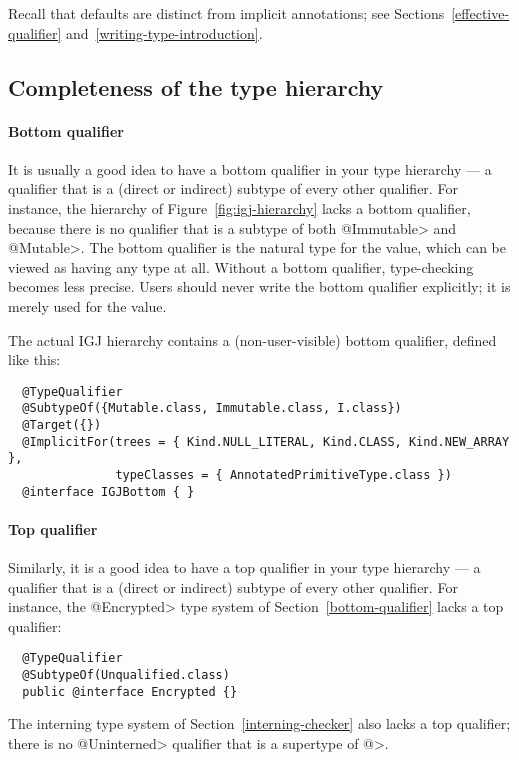 Recall that defaults are distinct
from implicit annotations; see Sections~\ref{effective-qualifier}
and~\ref{writing-type-introduction}.


\subsection{Completeness of the type hierarchy\label{bottom-qualifier}}

\paragraph{Bottom qualifier}
It is usually a good idea to have a bottom qualifier in your type hierarchy
--- a qualifier that is a (direct or indirect) subtype of every other
qualifier.  For instance, the hierarchy of Figure~\ref{fig:igj-hierarchy} lacks
a bottom qualifier, because there is no qualifier that is a subtype of both
\<@Immutable> and \<@Mutable>.
The bottom qualifier is the natural type for the 
value, which can be viewed as having any type at all.  Without a bottom
qualifier, type-checking becomes less precise.
Users should never write the bottom qualifier explicitly; it is merely used
for the  value.

The actual IGJ hierarchy contains a (non-user-visible) bottom qualifier,
defined like this:

\begin{Verbatim}
  @TypeQualifier
  @SubtypeOf({Mutable.class, Immutable.class, I.class})
  @Target({})
  @ImplicitFor(trees = { Kind.NULL_LITERAL, Kind.CLASS, Kind.NEW_ARRAY },
               typeClasses = { AnnotatedPrimitiveType.class })
  @interface IGJBottom { }
\end{Verbatim}



\paragraph{Top qualifier}
Similarly, it is a good idea to have a top qualifier in your type hierarchy
--- a qualifier that is a (direct or indirect) subtype of every other
qualifier.  For instance, the \<@Encrypted> type system of
Section~\ref{bottom-qualifier} lacks a top qualifier:

\begin{Verbatim}
  @TypeQualifier
  @SubtypeOf(Unqualified.class)
  public @interface Encrypted {}
\end{Verbatim}

\noindent
The interning type system of Section~\ref{interning-checker} also lacks a
top qualifier; there is no \<@Uninterned> qualifier that is a supertype of 
\<@>.

